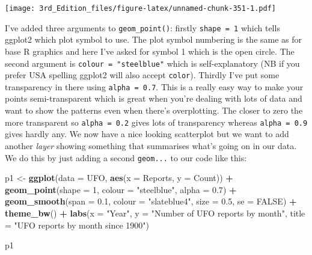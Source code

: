 \documentclass[
]{book}
\newenvironment{Shaded}{\begin{snugshade}}{\end{snugshade}}
\newcommand{\DataTypeTok}[1]{\textcolor[rgb]{0.13,0.29,0.53}{#1}}
\newcommand{\DecValTok}[1]{\textcolor[rgb]{0.00,0.00,0.81}{#1}}
\newcommand{\FloatTok}[1]{\textcolor[rgb]{0.00,0.00,0.81}{#1}}
\newcommand{\KeywordTok}[1]{\textcolor[rgb]{0.13,0.29,0.53}{\textbf{#1}}}
\newcommand{\NormalTok}[1]{#1}
\newcommand{\OperatorTok}[1]{\textcolor[rgb]{0.81,0.36,0.00}{\textbf{#1}}}
\newcommand{\OtherTok}[1]{\textcolor[rgb]{0.56,0.35,0.01}{#1}}
\newcommand{\StringTok}[1]{\textcolor[rgb]{0.31,0.60,0.02}{#1}}
\begin{document}
\texttt{[image: 3rd\_Edition\_files/figure-latex/unnamed-chunk-351-1.pdf]}

I've added three arguments to \texttt{geom\_point()}: firstly \texttt{shape\ =\ 1} which tells ggplot2 which plot symbol to use. The plot symbol numbering is the same as for base R graphics and here I've asked for symbol 1 which is the open circle. The second argument is \texttt{colour\ =\ "steelblue"} which is self-explanatory (NB if you prefer USA spelling ggplot2 will also accept \texttt{color}). Thirdly I've put some transparency in there using \texttt{alpha\ =\ 0.7}. This is a really easy way to make your points semi-transparent which is great when you're dealing with lots of data and want to show the patterns even when there's overplotting. The closer to zero the more transparent so \texttt{alpha\ =\ 0.2} gives lots of transparency whereas \texttt{alpha\ =\ 0.9} gives hardly any. We now have a nice looking scatterplot but we want to add another \emph{layer} showing something that summarises what's going on in our data. We do this by just adding a second \texttt{geom...} to our code like this:

\begin{Shaded}
\begin{Highlighting}[]
\NormalTok{p1 <-}\StringTok{ }\KeywordTok{ggplot}\NormalTok{(}\DataTypeTok{data =}\NormalTok{ UFO, }\KeywordTok{aes}\NormalTok{(}\DataTypeTok{x =}\NormalTok{ Reports, }
                             \DataTypeTok{y =}\NormalTok{ Count)) }\OperatorTok{+}
\StringTok{               }\KeywordTok{geom_point}\NormalTok{(}\DataTypeTok{shape =} \DecValTok{1}\NormalTok{, }
                          \DataTypeTok{colour =} \StringTok{"steelblue"}\NormalTok{, }
                          \DataTypeTok{alpha =} \FloatTok{0.7}\NormalTok{) }\OperatorTok{+}
\StringTok{               }\KeywordTok{geom_smooth}\NormalTok{(}\DataTypeTok{span =} \FloatTok{0.1}\NormalTok{, }
                           \DataTypeTok{colour =} \StringTok{"slateblue4"}\NormalTok{, }
                           \DataTypeTok{size =} \FloatTok{0.5}\NormalTok{, }
                           \DataTypeTok{se =} \OtherTok{FALSE}\NormalTok{) }\OperatorTok{+}
\StringTok{               }\KeywordTok{theme_bw}\NormalTok{() }\OperatorTok{+}
\StringTok{               }\KeywordTok{labs}\NormalTok{(}\DataTypeTok{x =} \StringTok{"Year"}\NormalTok{, }
                    \DataTypeTok{y =} \StringTok{"Number of UFO reports by month"}\NormalTok{, }
                    \DataTypeTok{title =} \StringTok{"UFO reports by month since 1900"}\NormalTok{)}

\NormalTok{p1}
\end{Highlighting}
\end{Shaded}
\end{document}
